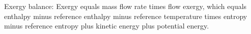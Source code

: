 Exergy balance:  
Exergy equals mass flow rate times flow exergy, which equals enthalpy minus reference enthalpy minus reference temperature times entropy minus reference entropy plus kinetic energy plus potential energy.